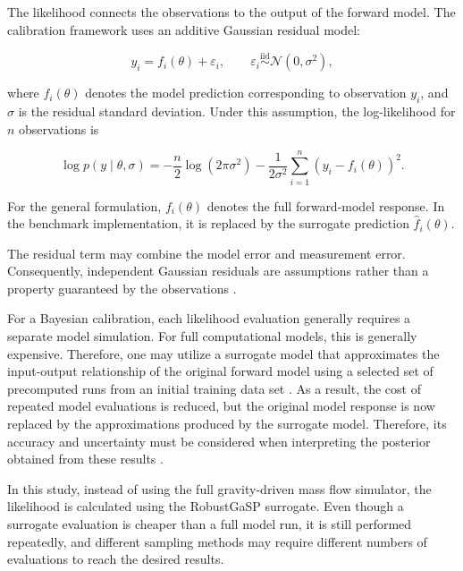 The likelihood connects the observations to the output of the forward model. The calibration framework uses an additive Gaussian residual model:

\begin{equation}
    y_i
    =
    f_i(\theta)
    +
    \varepsilon_i,
    \qquad
    \varepsilon_i
    \overset{\mathrm{iid}}{\sim}
    \mathcal{N}(0,\sigma^2),
    \label{eq:additive-error-model}
\end{equation}

where $f_i(\theta)$ denotes the model prediction corresponding to observation $y_i$, and $\sigma$ is the residual standard deviation. Under this assumption, the log-likelihood for $n$ observations is

\begin{equation}
    \log p(y \mid \theta,\sigma)
    =
    -\frac{n}{2}\log(2\pi\sigma^2)
    -
    \frac{1}{2\sigma^2}
    \sum_{i=1}^{n}
    \left(y_i-f_i(\theta)\right)^2.
    \label{eq:gaussian-log-likelihood}
\end{equation}

For the general formulation, $f_i(\theta)$ denotes the full forward-model response. In the benchmark implementation, it is replaced by the surrogate prediction $\widehat{f}_i(\theta)$.

The residual term may combine the model error and measurement error. Consequently, independent Gaussian residuals are assumptions rather than a property guaranteed by the observations \autocite{Kennedy2001,Brynjarsdottir2014,Heredia2020}.

For a Bayesian calibration, each likelihood evaluation generally requires a separate model simulation. For full computational models, this is generally expensive. Therefore, one may utilize a surrogate model that approximates the input-output relationship of the original forward model using a selected set of precomputed runs from an initial training data set \autocite{Gu2024,Yildiz2023}. As a result, the cost of repeated model evaluations is reduced, but the original model response is now replaced by the approximations produced by the surrogate model. Therefore, its accuracy and uncertainty must be considered when interpreting the posterior obtained from these results \autocite{Gu2024,Yildiz2023,ZhaoKowalski2022}.

In this study, instead of using the full gravity-driven mass flow simulator, the likelihood is calculated using the RobustGaSP surrogate. Even though a surrogate evaluation is cheaper than a full model run, it is still performed repeatedly, and different sampling methods may require different numbers of evaluations to reach the desired results.

